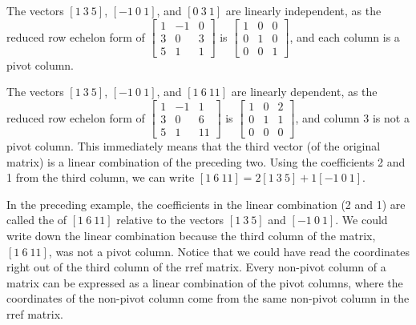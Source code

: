 {\begin{example}
The vectors 
$[1\ 3\ 5]$,
$[-1\ 0\ 1]$, and
$[0\ 3\ 1]$ 
are linearly independent, as the reduced row echelon form of 
$ \begin{bmatrix} 1&-1&0\\3&0&3\\5&1&1\end{bmatrix}$ is 
$ \begin{bmatrix} 1&0&0\\0&1&0\\0&0&1\end{bmatrix}$, 
and each column is a pivot column.
\end{example}
\begin{example}
The vectors $[1\ 3\ 5]$, 
$[-1\ 0\ 1]$, and $[1\ 6\ 11]$
are linearly dependent, as the reduced row echelon form of 
$ \begin{bmatrix} 1&-1&1\\3&0&6\\5&1&11\end{bmatrix} $ 
is 
$ \begin{bmatrix} 1&0&2\\0&1&1\\0&0&0\end{bmatrix}$, 
and column 3 is not a pivot column. This immediately means that the third vector (of the original matrix) is a linear combination of the preceding two. Using the coefficients 2 and 1 from the third column, we can write 
$[1\ 6\ 11] = 2 [1\ 3\ 5]+1[-1\ 0\ 1]$. 
\end{example}
In the preceding example, the coefficients in the linear combination (2 and 1) are called the  of $[1~6~11]$ relative to the vectors $[1~3~5]$ and $[-1~0~1]$.  We could write down the linear combination because the third column of the matrix, $[1~6~11]$, was not a pivot column.  Notice that we could have read the coordinates right out of the third column of the rref matrix.  Every non-pivot column of a matrix can be expressed as a linear combination of the pivot columns, where the coordinates of the non-pivot column come from the same non-pivot column in the rref matrix.


}
